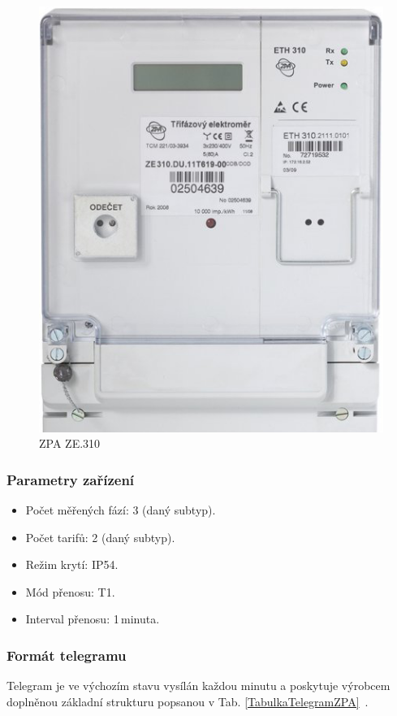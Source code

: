 	 \begin{figure}[!h]
  \begin{center}
    \includegraphics[scale=0.30]{obrazky/zarizeni_zpa}
  \end{center}
	\vspace{-20pt}
  \caption{ZPA ZE.310~\cite{CidloZpa}}
	\vspace{-30pt}
\end{figure}


\subsubsection{Parametry zařízení}
\begin{itemize}
	\item Počet měřených fází: 3 (daný subtyp).
	\item Počet tarifů: 2 (daný subtyp).
	\item Režim krytí: IP54.
	\item Mód přenosu: T1.
	\item Interval přenosu: 1\,minuta.
\end{itemize}

\subsubsection{Formát telegramu}
Telegram je ve výchozím stavu vysílán každou minutu a poskytuje výrobcem doplněnou základní strukturu popsanou v Tab. \ref{TabulkaTelegramZPA}~\cite{CidloZpa}.

